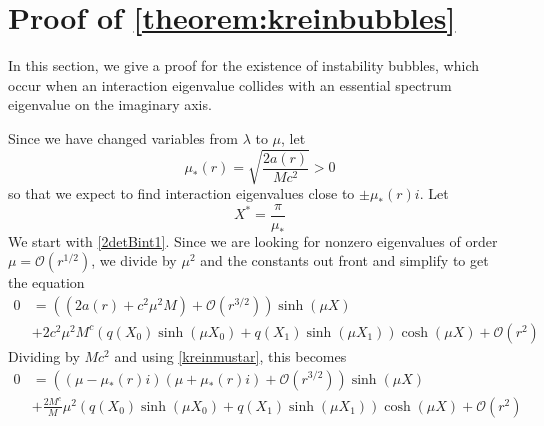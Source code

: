 \documentclass[thesis.tex]{subfiles}
\begin{document}
\section{Proof of \cref{theorem:kreinbubbles}}

In this section, we give a proof for the existence of instability bubbles, which occur when an interaction eigenvalue collides with an essential spectrum eigenvalue on the imaginary axis. 

Since we have changed variables from $\lambda$ to $\mu$, let
\begin{equation}\label{kreinmustar}
\mu_*(r) = \sqrt{\frac{2 a(r)}{M c^2}} > 0
\end{equation}
so that we expect to find interaction eigenvalues close to $\pm \mu_*(r) i$. Let
\[
X^* = \frac{\pi}{\mu_*}
\]
We start with \cref{2detBint1}. Since we are looking for nonzero eigenvalues of order $\mu = \mathcal{O}(r^{1/2})$, we divide by $\mu^2$ and the constants out front and simplify to get the equation
\begin{equation}\label{KreinB1}
\begin{aligned}
0 &= \left( (2a(r) + c^2 \mu^2 M) +  \mathcal{O}( r^{3/2} )\right) \sinh(\mu X) \\
&+ 2 c^2 \mu^2 M^c ( q(X_0) \sinh(\mu X_0) + q(X_1) \sinh(\mu X_1) ) \cosh(\mu X) + \mathcal{O}( r^2 ) 
\end{aligned}
\end{equation}
Dividing by $M c^2$ and using \cref{kreinmustar}, this becomes
\begin{equation}\label{KreinB2}
\begin{aligned}
0 &= \left( (\mu - \mu_*(r) i)( \mu + \mu_*(r) i) +  \mathcal{O}( r^{3/2} )\right) \sinh(\mu X) \\
&+\frac{2 M^c}{M} \mu^2 ( q(X_0)\sinh(\mu X_0) + q(X_1) \sinh(\mu X_1) ) \cosh(\mu X) + \mathcal{O}( r^2 ) 
\end{aligned}
\end{equation}
\end{document}
